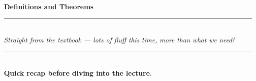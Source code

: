 \begin{titlepage}
    \null %
    \vfill
    \begin{center}
        {\Huge \textbf{Definitions and Theorems}} \\[20pt]
        \rule{\textwidth}{0.5mm} \\[15pt]
        {\Large \textit{Straight from the textbook — lots of fluff this time, more than what we need!}} \\[15pt]
        \rule{\textwidth}{0.5mm} \\[15pt]
        \textbf{Quick recap before diving into the lecture.}
    \end{center}
    \vfill
\end{titlepage}
